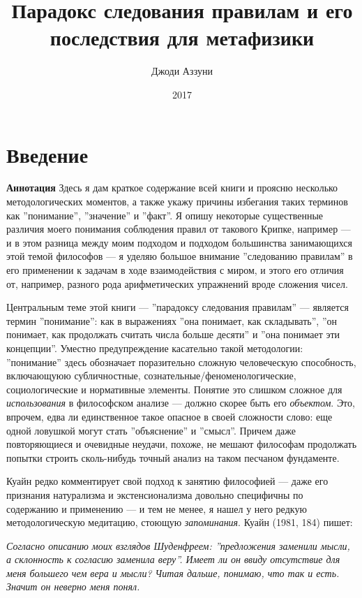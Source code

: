 \documentclass[12pt]{book}
\title{Парадокс следования правилам и его последствия для метафизики}
\author{Джоди Аззуни}
\date{2017}
\begin{document}
\maketitle

\tableofcontents

\chapter{Введение}

\qquad

\textbf{Аннотация} \quad Здесь я дам краткое содержание всей книги и проясню несколько методологических моментов, а также укажу причины избегания таких терминов как ''понимание'', ''значение'' и ''факт''. Я опишу некоторые существенные различия моего понимания соблюдения правил от такового Крипке, например --- и в этом разница между моим подходом и подходом большинства занимающихся этой темой философов --- я уделяю большое внимание ''следованию правилам'' в его применении к задачам в ходе взаимодействия с миром, и этого его отличия от, например, разного рода арифметических упражнений вроде сложения чисел.

\qquad

Центральным теме этой книги --- ''парадоксу следования правилам'' --- является термин ''понимание'': как в выражениях ''она понимает, как складывать'', ''он понимает, как продолжать считать числа больше десяти'' и ''она понимает эти концепции''. Уместно предупреждение касательно такой методологии: ''понимание'' здесь обозначает поразительно сложную человеческую способность, включающуюю субличностные, сознательные/феноменологические, социологические и нормативные элементы. Понятие это слишком сложное для \textit{использования} в философском анализе --- должно скорее быть его \textit{объектом}. Это, впрочем, едва ли единственное такое опасное в своей сложности слово: еще одной ловушкой могут стать ''объяснение'' и ''смысл''. Причем даже повторяющиеся и очевидные неудачи, похоже, не мешают философам продолжать попытки строить сколь-нибудь точный анализ на таком песчаном фундаменте.

Куайн редко комментирует свой подход к занятию философией --- даже его признания натурализма и экстенсионализма довольно специфичны по содержанию и применению --- и тем не менее, я нашел у него редкую методологическую медитацию, стоющую \textit{запоминания}. Куайн (1981, 184) пишет:

\smallskip

\textit{Согласно описанию моих взглядов Шуденфреем: ''предложения заменили мысли, а склонность к согласию заменила веру''. Имеет ли он ввиду отсутствие для меня большего чем вера и мысли? Читая дальше, понимаю, что так и есть. Значит он неверно меня понял.}
\end{document}
